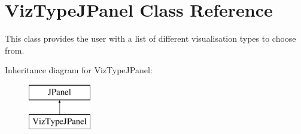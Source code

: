 \hypertarget{class_viz_type_j_panel}{\section{Viz\-Type\-J\-Panel Class Reference}
\label{class_viz_type_j_panel}
}


This class provides the user with a list of different visualisation types to choose from.  


Inheritance diagram for Viz\-Type\-J\-Panel\-:\begin{figure}[H]
\begin{center}
\leavevmode
\includegraphics[height=2.000000cm]{class_viz_type_j_panel}
\end{center}
\end{figure}
